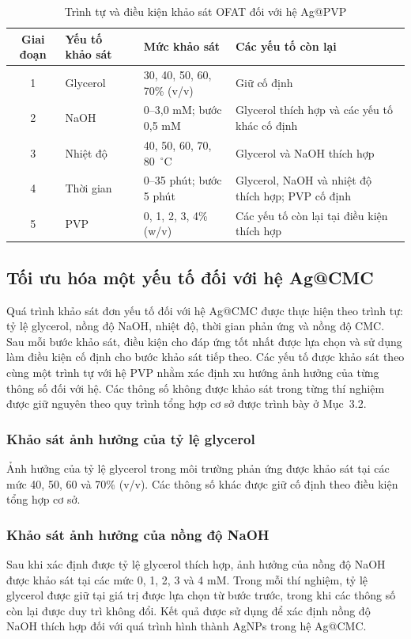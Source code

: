 \begin{table}[htbp]
\centering
\caption{Trình tự và điều kiện khảo sát OFAT đối với hệ Ag@PVP}
\label{tab:ofat-ag-pvp}
\begin{tabular}{@{}clp{5.0cm}p{5.0cm}@{}}
\toprule
Giai đoạn & Yếu tố khảo sát & Mức khảo sát & Các yếu tố còn lại \\
\midrule
1 & Glycerol & 30, 40, 50, 60, 70\% (v/v) & Giữ cố định \\
2 & NaOH & 0--3,0 mM; bước 0,5 mM & Glycerol thích hợp và các yếu tố khác cố định \\
3 & Nhiệt độ & 40, 50, 60, 70, 80~$^\circ$C & Glycerol và NaOH thích hợp \\
4 & Thời gian & 0--35 phút; bước 5 phút & Glycerol, NaOH và nhiệt độ thích hợp; PVP cố định \\
5 & PVP & 0, 1, 2, 3, 4\% (w/v) & Các yếu tố còn lại tại điều kiện thích hợp \\
\bottomrule
\end{tabular}
\end{table}

\subsection{Tối ưu hóa một yếu tố đối với hệ Ag@CMC}
Quá trình khảo sát đơn yếu tố đối với hệ Ag@CMC được thực hiện theo trình tự: tỷ lệ glycerol, nồng độ NaOH, nhiệt độ, thời gian phản ứng và nồng độ CMC.
Sau mỗi bước khảo sát, điều kiện cho đáp ứng tốt nhất được lựa chọn và sử dụng làm điều kiện cố định cho bước khảo sát tiếp theo.
Các yếu tố được khảo sát theo cùng một trình tự với hệ PVP nhằm xác định xu hướng ảnh hưởng của từng thông số đối với hệ.
Các thông số không được khảo sát trong từng thí nghiệm được giữ nguyên theo quy trình tổng hợp cơ sở được trình bày ở Mục~3.2.

\subsubsection{Khảo sát ảnh hưởng của tỷ lệ glycerol}
Ảnh hưởng của tỷ lệ glycerol trong môi trường phản ứng được khảo sát tại các mức 40, 50, 60 và 70\% (v/v).
Các thông số khác được giữ cố định theo điều kiện tổng hợp cơ sở.

\subsubsection{Khảo sát ảnh hưởng của nồng độ NaOH}
Sau khi xác định được tỷ lệ glycerol thích hợp, ảnh hưởng của nồng độ NaOH được khảo sát tại các mức 0, 1, 2, 3 và 4 mM.
Trong mỗi thí nghiệm, tỷ lệ glycerol được giữ tại giá trị được lựa chọn từ bước trước, trong khi các thông số còn lại được duy trì không đổi.
Kết quả được sử dụng để xác định nồng độ NaOH thích hợp đối với quá trình hình thành AgNPs trong hệ Ag@CMC.

